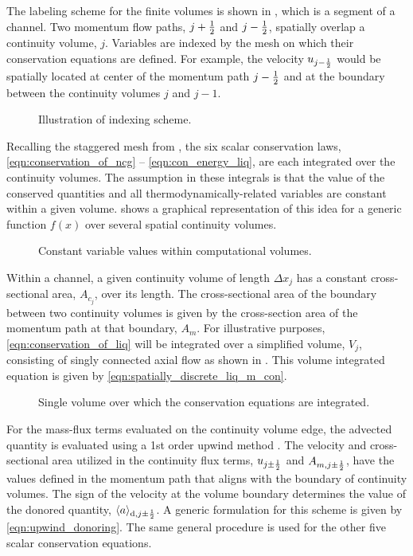 The labeling scheme for the finite volumes is shown in , which is a segment of a channel.
Two momentum flow paths, $j + \onehalf $ and $j - \onehalf$, spatially overlap a continuity volume, $j$.
Variables are indexed by the mesh on which their conservation equations are defined.
For example, the velocity $u_{j - \onehalf}$ would be spatially located at center of the momentum path $j - \onehalf $ and at the boundary between the continuity volumes $j$ and $j-1$.

\begin{figure}[ht!]
\centering

\caption{Illustration of indexing scheme.}
\label{fig:vertical_pipe_with_cells}
\end{figure}

Recalling the staggered mesh from , the six scalar conservation laws, \eqref{eqn:conservation_of_ncg} -- \eqref{eqn:con_energy_liq}, are each integrated over the continuity volumes.
The assumption in these integrals is that the value of the conserved quantities and all thermodynamically-related variables are constant within a given volume.
 shows a graphical representation of this idea for a generic function $f(x)$ over several spatial continuity volumes. 

\begin{figure}[ht!]
\centering

\caption{Constant variable values within computational volumes.}
\label{fig:constant_value}
\end{figure}

Within a channel, a given continuity volume of length $\Delta x_{j} $ has a constant cross-sectional area, $A_{c_{j}}$, over its length.
The cross-sectional area of the boundary between two continuity volumes is given by the cross-section area of the momentum path at that boundary, $A_{m}$.
For illustrative purposes, \eqref{eqn:conservation_of_liq} will be integrated over a simplified volume, $V_j$, consisting of singly connected axial flow as shown in .
This volume integrated equation is given by \eqref{eqn:spatially_discrete_liq_m_con}.

\begin{figure}[ht!]
\centering

\caption{Single volume over which the conservation equations are integrated.}
\label{fig:single_volume}
\end{figure}

For the mass-flux terms evaluated on the continuity volume edge, the advected quantity is evaluated using a 1st order upwind method \cite{Tannehill1997}.
The velocity and cross-sectional area utilized in the continuity flux terms, $u_{j \pm \onehalf}$ and $A_{m,j \pm \onehalf}$, have the values defined in the momentum path that aligns with the boundary of continuity volumes.
The sign of the velocity at the volume boundary determines the value of the donored quantity, $\don{a}_{\text{d},j \pm \onehalf}$.
A generic formulation for this scheme is given by \eqref{eqn:upwind_donoring}.
The same general procedure is used for the other five scalar conservation equations.

